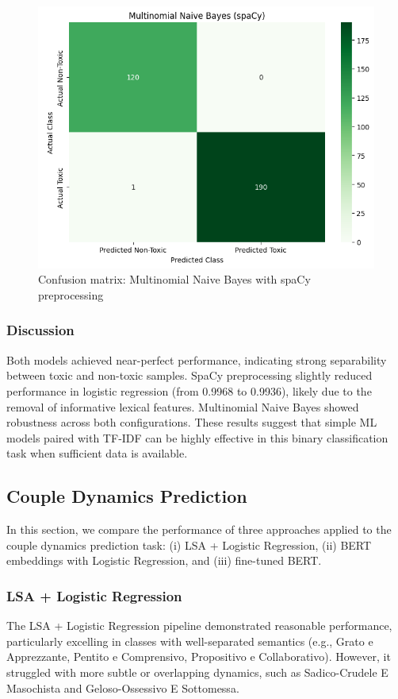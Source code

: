 \documentclass[conference]{IEEEtran}
\begin{document}
\begin{figure}[H]
  \centering
  \includegraphics[width=0.9\columnwidth]{figures/confusion_nb_spacy.png}
  \caption{Confusion matrix: Multinomial Naive Bayes with spaCy preprocessing}
\end{figure}

\subsubsection{Discussion}

Both models achieved near-perfect performance, indicating strong separability between toxic and non-toxic samples. SpaCy preprocessing slightly reduced performance in logistic regression (from 0.9968 to 0.9936), likely due to the removal of informative lexical features. Multinomial Naive Bayes showed robustness across both configurations. These results suggest that simple ML models paired with TF‑IDF can be highly effective in this binary classification task when sufficient data is available.

\subsection{Couple Dynamics Prediction}

In this section, we compare the performance of three approaches applied to the couple dynamics prediction task: (i) LSA + Logistic Regression, (ii) BERT embeddings with Logistic Regression, and (iii) fine-tuned BERT.

\subsubsection{LSA + Logistic Regression}
\noindent
The LSA + Logistic Regression pipeline demonstrated reasonable performance, particularly excelling in classes with well-separated semantics (e.g., Grato e Apprezzante, Pentito e Comprensivo, Propositivo e Collaborativo). However, it struggled with more subtle or overlapping dynamics, such as Sadico-Crudele E Masochista and Geloso-Ossessivo E Sottomessa.
\end{document}
